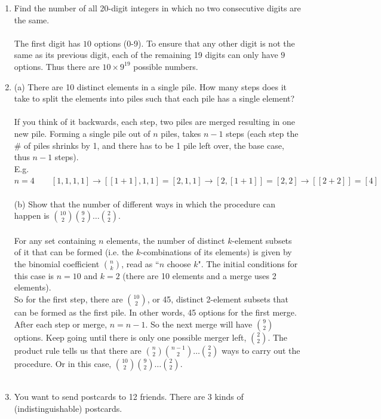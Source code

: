 \documentclass[10pt,a4paper,final]{article}
\begin{document}
\begin{enumerate}
\item %
Find the number of all 20-digit integers in which no two consecutive digits are the same.\\
\\
The first digit has $10$ options (0-9).
To ensure that any other digit is not the same as its previous digit,
each of the remaining 19 digits can only have $9$ options.
Thus there are $10 \times 9^{19}$ possible numbers.

\item %
(a) There are 10 distinct elements in a single pile.
How many steps does it take to split the elements into piles such that
each pile has a single element?\\
\\
If you think of it backwards, each step, two piles are merged
resulting in one new pile. Forming a single pile out of $n$ piles, takes $n-1$ steps
(each step the \# of piles shrinks by 1, and there has to be 1 pile left over, the base case,
thus $n-1$ steps).\\
E.g. $n = 4 \qquad [1,1,1,1] \rightarrow [[1 + 1],1,1] = [2,1,1]
\rightarrow [2,[1 + 1]] = [2,2] \rightarrow [[2 + 2]] = [4]$\\
\\
(b) Show that the number of different ways in which the procedure can happen
is ${10 \choose 2} {9 \choose 2} \dots {2 \choose 2}$.\\
\\
For any set containing $n$ elements, the number of distinct $k$-element
subsets of it that can be formed (i.e. the $k$-combinations of its elements)
is given by the binomial coefficient $\binom{n}{k}$, read as ``$n$ choose $k$".
The initial conditions for this case is $n = 10$ and $k = 2$
(there are 10 elements and a merge uses 2 elements).\\
So for the first step, there are $10 \choose 2$, or 45, distinct 2-element subsets that
can be formed as the first pile. In other words, 45 options for the first merge.
After each step or merge, $n = n - 1$. So the next merge will have $9 \choose 2$ options.
Keep going until there is only one possible merger left, $2 \choose 2$.
The product rule tells us that there are $\binom{n}{2} \binom{n-1}{2} \dots \binom{2}{2}$
ways to carry out the procedure. Or in this case,
$\binom{10}{2} \binom{9}{2} \dots \binom{2}{2}$.\\
\\
\item %
You want to send postcards to 12 friends. There are 3 kinds of (indistinguishable) postcards.\\

\end{enumerate}
\end{document}
